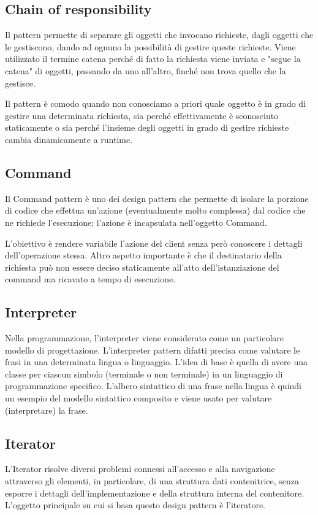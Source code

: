 \subsection{Chain of responsibility}
Il pattern permette di separare gli oggetti che invocano richieste, dagli oggetti che le gestiscono, dando ad ognuno la possibilità di gestire queste richieste. Viene utilizzato il termine catena perché di fatto la richiesta viene inviata e "segue la catena" di oggetti, passando da uno all'altro, finché non trova quello che la gestisce.

Il pattern è comodo quando non conosciamo a priori quale oggetto è in grado di gestire una determinata richiesta, sia perché effettivamente è sconosciuto staticamente o sia perché l'insieme degli oggetti in grado di gestire richieste cambia dinamicamente a runtime.
\subsection{Command}
Il Command pattern è uno dei design pattern che permette di isolare la porzione di codice che effettua un'azione (eventualmente molto complessa) dal codice che ne richiede l'esecuzione; l'azione è incapsulata nell'oggetto Command.

L'obiettivo è rendere variabile l'azione del client senza però conoscere i dettagli dell'operazione stessa. Altro aspetto importante è che il destinatario della richiesta può non essere deciso staticamente all'atto dell'istanziazione del command ma ricavato a tempo di esecuzione.
\subsection{Interpreter}
Nella programmazione, l'interpreter viene considerato come un particolare modello di progettazione. L'interpreter pattern difatti precisa come valutare le frasi in una determinata lingua o linguaggio. L'idea di base è quella di avere una classe per ciascun simbolo (terminale o non terminale) in un linguaggio di programmazione specifico. L'albero sintattico di una frase nella lingua è quindi un esempio del modello sintattico composito e viene usato per valutare (interpretare) la frase.

\subsection{Iterator}
L'Iterator risolve diversi problemi connessi all'accesso e alla navigazione attraverso gli elementi, in particolare, di una struttura dati contenitrice, senza esporre i dettagli dell'implementazione e della struttura interna del contenitore. L'oggetto principale su cui si basa questo design pattern è l'iteratore.

